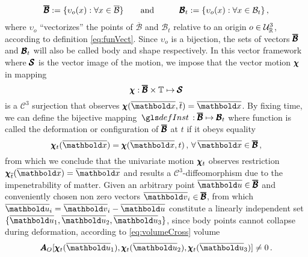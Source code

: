 \begin{alignat}{3} 
\tnr{\overline{\mathcal{B}}}:=\{\fua{\upsilon_o}{x}:\forall x\in\overline{\mathcal{B}}\}&\qquad \text{and}\qquad & \tnr{\mathcal{B}}_t:=\{\fua{\upsilon_o}{x}:\forall x\in\mathcal{B}_t\}\,,
\end{alignat}
where $\upsilon_o$ ``vectorizes'' the points of $\overline{\mathcal{B}}$ and $\mathcal{B}_t$ relative to an origin $o\in\eamd{U}{R}{3}$, according to definition \eqref{eq:funVect}. Since $\upsilon_o$ is a bijection, the sets of vectors $\tnr{\overline{\mathcal{B}}}$ and $\tnr{\mathcal{B}}_t$ will also be called body and shape respectively. In this vector framework where $\tnr{\mathcal{S}}$ is the vector image of the motion, we impose that the vector motion $\tnr{\chi}$ in mapping 
\begin{equation}\label{eq:vecMotion}
\map{\tnr{\chi}}{\tnr{\overline{\mathcal{B}}}\times\tempo}{\tnr{\mathcal{S}}}
\end{equation}
is a $\mathcal{C}^{3}$ surjection that observes $\fua{\tnr{\chi}}{\overline{\vto{x}},\overline{t}}=\overline{\vto{x}}$. By fixing time, we can define the bijective mapping $\map{\gloref{defInst}}{\tnr{\overline{\mathcal{B}}}}{\tnr{\mathcal{B}}_t}$ where function is called the deformation or configuration of $\tnr{\overline{\mathcal{B}}}$ at $t$ if it obeys equality 
\begin{equation}
\fua{\tnr{\chi}_t}{\overline{\vto{x}}}=\fua{\tnr{\chi}}{\overline{\vto{x}},t}\,,\,\forall\, \overline{\vto{x}}\in\tnr{\overline{\mathcal{B}}}\,,
\end{equation}
from which we conclude that the univariate motion $\tnr{\chi}_t$ observes restriction $\tnr{\chi}_{\overline{t}}(\overline{\vto{x}})=\overline{\vto{x}}$ and results a $\mathcal{C}^{3}$-diffeomorphism due to the impenetrability of matter. Given an arbitrary point $\overline{\vto{u}}\in\tnr{\overline{\mathcal{B}}}$ and conveniently chosen non zero vectors $\overline{\vto{v}}_i\in\tnr{\overline{\mathcal{B}}}$, from which $\overline{\vto{u}}_i=\overline{\vto{v}}_i-\overline{\vto{u}}$ constitute a linearly independent set $\{ \overline{\vto{u}}_1,\overline{\vto{u}}_2,\overline{\vto{u}}_3\}$, since body points cannot collapse during deformation, according to \eqref{eq:volumeCross} volume
\begin{equation}
{\tnr{A}_O}[\fua{\tnr{\chi}_t}{\overline{\vto{u}}_1},\fua{\tnr{\chi}_t}{\overline{\vto{u}}_2},\fua{\tnr{\chi}_t}{\overline{\vto{u}}_3}]\neq 0\,.
\end{equation}
